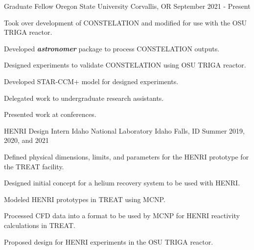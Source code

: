
\begin{cventries}
  \cventry
    {Graduate Fellow} %
    {Oregon State University} %
    {Corvallis, OR} %
    {September 2021 - Present} %
    {
      \begin{cvitems} %
        \item {Took over development of CONSTELATION and modified for use with the OSU TRIGA reactor.}
        \item{Developed \textbf{\textit{astronomer}} package to process CONSTELATION outputs.}
        \item{Designed experiments to validate CONSTELATION using OSU TRIGA reactor.}
        \item{Developed STAR-CCM+ model for designed experiments.}
        \item{Delegated work to undergraduate research assistants.}
        \item{Presented work at conferences.}
      \end{cvitems}
    }


  \cventry
    {HENRI Design Intern} %
    {Idaho National Laboratory} %
    {Idaho Falls, ID} %
    {Summer 2019, 2020, and 2021} %
    {
      \begin{cvitems} %
        \item {Defined physical dimensions, limits, and parameters for the HENRI prototype for the TREAT facility.}
        \item{Designed initial concept for a helium recovery system to be used with HENRI.}
        \item{Modeled HENRI prototypes in TREAT using MCNP.}
        \item{Processed CFD data into a format to be used by MCNP for HENRI reactivity calculations in TREAT.}
        \item{Proposed design for HENRI experiments in the OSU TRIGA reactor.}
      \end{cvitems}
    }


\end{cventries}
